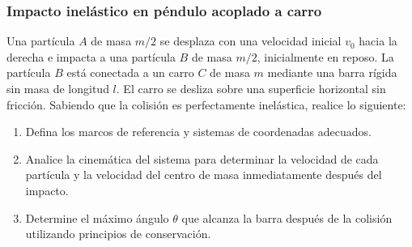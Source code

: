 \subsubsection{Impacto inelástico en péndulo acoplado a carro}

Una partícula $A$ de masa $m/2$ se desplaza con una velocidad inicial $v_0$ hacia la derecha e impacta a una partícula $B$ de masa $m/2$, inicialmente en reposo. La partícula $B$ está conectada a un carro $C$ de masa $m$ mediante una barra rígida sin masa de longitud $l$. El carro se desliza sobre una superficie horizontal sin fricción. Sabiendo que la colisión es perfectamente inelástica, realice lo siguiente:

\begin{enumerate}
    \item Defina los marcos de referencia y sistemas de coordenadas adecuados.
    \item Analice la cinemática del sistema para determinar la velocidad de cada partícula y la velocidad del centro de masa inmediatamente después del impacto.
    \item Determine el máximo ángulo $\theta$ que alcanza la barra después de la colisión utilizando principios de conservación.
\end{enumerate}

